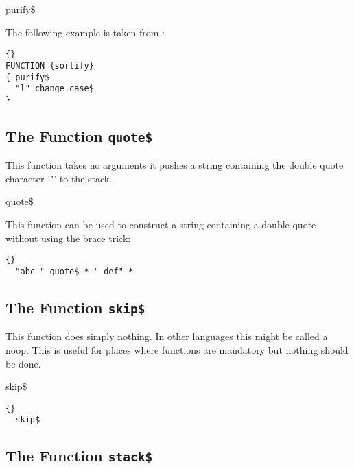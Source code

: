 \INCOMPLETE

\begin{BstFunction}{purify\$}
\end{BstFunction}

The following example is taken from :

\begin{lstlisting}{}
FUNCTION {sortify}
{ purify$
  "l" change.case$
}
\end{lstlisting}


\subsection{The Function \texttt{quote\$}}%

This function takes no arguments it pushes a string containing the
double quote character '"' to the stack.

\begin{BstFunction}{quote\$}
\end{BstFunction}

This function can be used to construct a string containing a double
quote without using the brace trick:

\begin{lstlisting}{}
  "abc " quote$ * " def" * 
\end{lstlisting}\fctIndex{*}


\subsection{The Function \texttt{skip\$}}%

This function does simply nothing. In other languages this might be
called a noop. This is useful for places where functions are
mandatory but nothing should be done.

\begin{BstFunction}{skip\$}
\end{BstFunction}

\begin{lstlisting}{}
  skip$
\end{lstlisting}


\subsection{The Function \texttt{stack\$}}%

